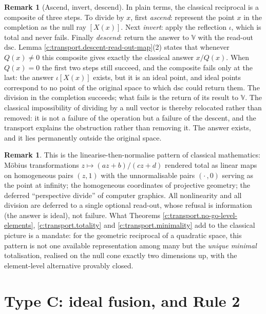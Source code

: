\documentclass[11pt]{article}
\theoremstyle{definition}
\newtheorem{remark}[theorem]{Remark}
\theoremstyle{plain}
\providecommand{\dsc}{}\renewcommand{\dsc}{\mathrm{dsc}}
\begin{document}
\begin{remark}[Ascend, invert, descend]\label{c:note.transport.ascend-invert-descend}
In plain terms, the classical reciprocal is a composite of three steps. To divide by $x$, first \emph{ascend}: represent the point $x$ in the completion as the null ray $[X(x)]$. Next \emph{invert}: apply the reflection $\iota$, which is total and never fails. Finally \emph{descend}: return the answer to $\mathbb{V}$ with the read-out $\dsc$. Lemma \ref{c:transport.descent-read-out-map}(2) states that whenever $Q(x) \neq 0$ this composite gives exactly the classical answer $x/Q(x)$. When $Q(x) = 0$ the first two steps still succeed, and the composite fails only at the last: the answer $\iota[X(x)]$ exists, but it is an ideal point, and ideal points correspond to no point of the original space to which $\dsc$ could return them. The division in the completion succeeds; what fails is the return of its result to $\mathbb{V}$. The classical impossibility of dividing by a null vector is thereby relocated rather than removed: it is not a failure of the operation but a failure of the descent, and the transport explains the obstruction rather than removing it. The answer exists, and it lies permanently outside the original space.
\end{remark}

\begin{remark}\label{c:note.transport.classical}
This is the linearise-then-normalise pattern of classical mathematics: M\"obius transformations $z \mapsto (az+b)/(cz+d)$ rendered total as linear maps on homogeneous pairs $(z,1)$ with the unnormalisable pairs $(\cdot\,,0)$ serving as the point at infinity; the homogeneous coordinates of projective geometry; the deferred ``perspective divide'' of computer graphics. All nonlinearity and all division are deferred to a single optional read-out, whose refusal is information (the answer is ideal), not failure. What Theorems \ref{c:transport.no-go-level-elements}, \ref{c:transport.totality} and \ref{c:transport.minimality} add to the classical picture is a mandate: for the geometric reciprocal of a quadratic space, this pattern is not one available representation among many but the \emph{unique minimal} totalisation, realised on the null cone exactly two dimensions up, with the element-level alternative provably closed.
\end{remark}

\section{Type C: ideal fusion, and Rule 2}
\end{document}
